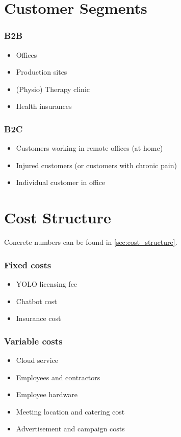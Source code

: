 \section{Customer Segments}
\subsubsection*{B2B}
\begin{itemize}
    \item Offices
    \item Production sites
    \item (Physio) Therapy clinic
    \item Health insurances
\end{itemize}

\subsubsection*{B2C}
\begin{itemize}
    \item Customers working in remote offices (at home)
    \item Injured customers (or customers with chronic pain)
    \item Individual customer in office
\end{itemize}

\section{Cost Structure}
Concrete numbers can be found in \ref{sec:cost_structure}.
\subsubsection*{Fixed costs}
\begin{itemize}
    \item YOLO licensing fee
    \item Chatbot cost
    \item Insurance cost
\end{itemize}

\subsubsection*{Variable costs}
\begin{itemize}
    \item Cloud service
    \item Employees and contractors
    \item Employee hardware
    \item Meeting location and catering cost
    \item Advertisement and campaign costs
\end{itemize}

